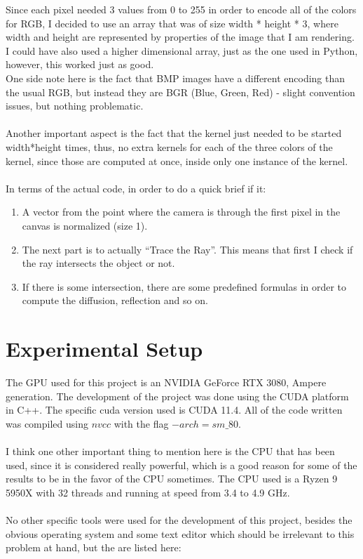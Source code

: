 \documentclass[english]{exam}
\begin{document}
Since each pixel needed 3 values from 0 to 255 in order to encode all of the colors for RGB, I decided to use an array that was of size width * height * 3, where width and height are represented by properties of the image that I am rendering. I could have also used a higher dimensional array, just as the one used in Python, however, this worked just as good.
\\
One side note here is the fact that BMP images have a different encoding than the usual RGB, but instead they are BGR (Blue, Green, Red) - slight convention issues, but nothing problematic.
\\\\
Another important aspect is the fact that the kernel just needed to be started width*height times, thus, no extra kernels for each of the three colors of the kernel, since those are computed at once, inside only one instance of the kernel.
\\\\
In terms of the actual code, in order to do a quick brief if it:
\begin{enumerate}
\item A vector from the point where the camera is through the first pixel in the canvas is normalized (size 1).
\item The next part is to actually ``Trace the Ray''. This means that first I check if the ray intersects the object or not.
\item If there is some intersection, there are some predefined formulas in order to compute the diffusion, reflection and so on.
\end{enumerate}

\section*{Experimental Setup}

The GPU used for this project is an NVIDIA GeForce RTX 3080, Ampere generation. The development of the project was done using the CUDA platform in C++. The specific cuda version used is CUDA 11.4. All of the code written was compiled using $nvcc$ with the flag $-arch=sm\_80$.
\\\\
I think one other important thing to mention here is the CPU that has been used, since it is considered really powerful, which is a good reason for some of the results to be in the favor of the CPU sometimes. The CPU used is a Ryzen 9 5950X with 32 threads and running at speed from 3.4 to 4.9 GHz.
\\\\
No other specific tools were used for the development of this project, besides the obvious operating system and some text editor which should be irrelevant to this problem at hand, but the are listed here:
\end{document}
